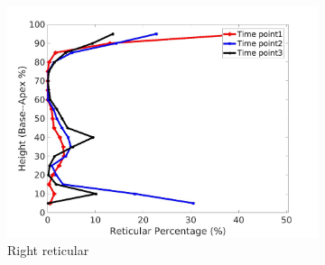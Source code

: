 \begin{figure}[H]
\begin{subfigure}{.42\linewidth}
  \includegraphics[width=\linewidth,trim={{.0\wd0} {.0\wd0} {.0\wd0} {.0\wd0}},clip]{QuantitativeAnalysis/Image/IPF21RightLungReticularDiseaseAgainstHeight.jpg}
  \caption{Right reticular}
  \label{fig:IPF21DiseaseAgainstHeightMain-d}
\end{subfigure}
\begin{subfigure}{.42\linewidth}%

\end{subfigure}
\end{figure}
